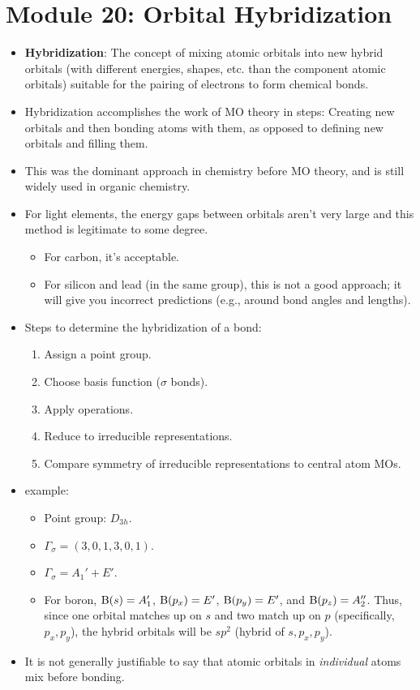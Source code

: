 \documentclass[../notes.tex]{subfiles}
\begin{document}
\section{Module 20: Orbital Hybridization}
\begin{itemize}
    \item \textbf{Hybridization}: The concept of mixing atomic orbitals into new hybrid orbitals (with different energies, shapes, etc. than the component atomic orbitals) suitable for the pairing of electrons to form chemical bonds.
    \item Hybridization accomplishes the work of MO theory in steps: Creating new orbitals and then bonding atoms with them, as opposed to defining new orbitals and filling them.
    \item This was the dominant approach in chemistry before MO theory, and is still widely used in organic chemistry.
    \item For light elements, the energy gaps between orbitals aren't very large and this method is legitimate to some degree.
    \begin{itemize}
        \item For carbon, it's acceptable.
        \item For silicon and lead (in the same group), this is not a good approach; it will give you incorrect predictions (e.g., around bond angles and lengths).
    \end{itemize}
    \item Steps to determine the hybridization of a bond:
    \begin{enumerate}
        \item Assign a point group.
        \item Choose basis function ($\sigma$ bonds).
        \item Apply operations.
        \item Reduce to irreducible representations.
        \item Compare symmetry of irreducible representations to central atom MOs.
    \end{enumerate}
    \item {} example:
    \begin{itemize}
        \item Point group: $D_{3h}$.
        \item $\Gamma_\sigma=(3,0,1,3,0,1)$.
        \item $\Gamma_\sigma=A_1'+E'$.
        \item For boron, $\ce{B}(s)=A_1'$, $\ce{B}(p_x)=E'$, $\ce{B}(p_y)=E'$, and $\ce{B}(p_z)=A_2''$. Thus, since one orbital matches up on $s$ and two match up on $p$ (specifically, $p_x,p_y$), the hybrid orbitals will be $sp^2$ (hybrid of $s,p_x,p_y$).
    \end{itemize}
    \item It is not generally justifiable to say that atomic orbitals in \emph{individual} atoms mix before bonding.
\end{itemize}
\end{document}
